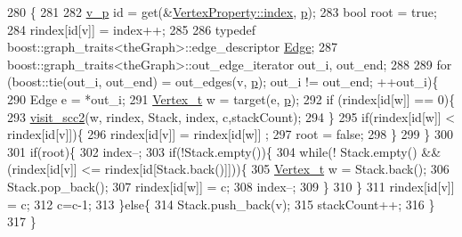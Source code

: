 \begin{DoxyCode}
280                                          \{
281 
282     \hyperlink{utilities_8h_a3f4959b3d837fa6351a9414c79280286}{v\_p} \textcolor{keywordtype}{id} = \textcolor{keyword}{get}(&\hyperlink{struct_utility_structs_1_1_vertex_property_a636cb729438e999aa3d9a17ac39d8641}{VertexProperty::index}, \hyperlink{class_pearce_a2320928312fd97f6bcb1f16684f79a03}{p});
283     \textcolor{keywordtype}{bool}  root = \textcolor{keyword}{true};
284     rindex[\textcolor{keywordtype}{id}[v]] = index++;
285 
286     \textcolor{keyword}{typedef} boost::graph\_traits<theGraph>::edge\_descriptor \hyperlink{class_graph_component_aa7517b2af08aa717324076a645c73fe6}{Edge};
287     boost::graph\_traits<theGraph>::out\_edge\_iterator out\_i, out\_end;
288 
289     \textcolor{keywordflow}{for} (boost::tie(out\_i, out\_end) = out\_edges(v, \hyperlink{class_pearce_a2320928312fd97f6bcb1f16684f79a03}{p}); out\_i != out\_end; ++out\_i)\{
290         Edge e = *out\_i;
291         \hyperlink{utilities_8h_a344cd987714d06997f0becda3c96d6e2}{Vertex\_t} w = target(e, \hyperlink{class_pearce_a2320928312fd97f6bcb1f16684f79a03}{p});
292         \textcolor{keywordflow}{if} (rindex[\textcolor{keywordtype}{id}[w]] == 0)\{
293             \hyperlink{class_pearce_a12c836f8f0dbd85e20c0f3f4f0c5fb47}{visit\_scc2}(w, rindex, Stack, index, c,stackCount);
294         \}
295         \textcolor{keywordflow}{if}(rindex[\textcolor{keywordtype}{id}[w]] < rindex[\textcolor{keywordtype}{id}[v]])\{
296             rindex[\textcolor{keywordtype}{id}[v]] = rindex[\textcolor{keywordtype}{id}[w]] ;
297             root = \textcolor{keyword}{false};
298         \}
299     \}
300 
301     \textcolor{keywordflow}{if}(root)\{
302         index--;
303         \textcolor{keywordflow}{if}(!Stack.empty())\{
304             \textcolor{keywordflow}{while}(! Stack.empty() && (rindex[\textcolor{keywordtype}{id}[v]] <= rindex[\textcolor{keywordtype}{id}[Stack.back()]]))\{
305                 \hyperlink{utilities_8h_a344cd987714d06997f0becda3c96d6e2}{Vertex\_t} w = Stack.back();
306                 Stack.pop\_back();
307                 rindex[\textcolor{keywordtype}{id}[w]] = c;
308                 index--; 
309             \}
310         \}
311         rindex[\textcolor{keywordtype}{id}[v]] = c;
312         c=c-1;
313     \}\textcolor{keywordflow}{else}\{
314         Stack.push\_back(v);
315         stackCount++;
316     \}
317 \}
\end{DoxyCode}
\mbox{\label{class_pearce_a70800d4564b36fb64762d3a78f1f67d8}} 
